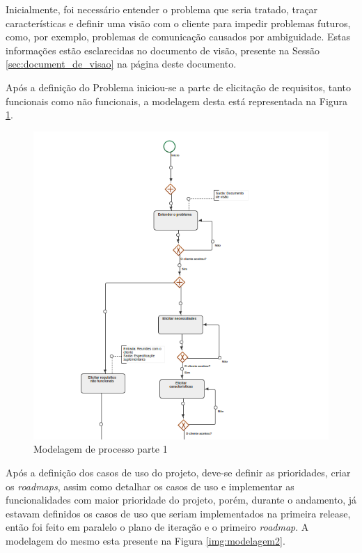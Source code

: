 
Inicialmente, foi necessário entender o problema que seria tratado, traçar características e definir uma visão com o cliente para impedir problemas futuros, como, por exemplo, problemas de comunicação causados por ambiguidade. Estas informações estão esclarecidas no documento de visão, presente na Sessão \ref{sec:document_de_visao} na página \pageref{sec:document_de_visao} deste documento.

Após a definição do Problema iniciou-se a parte de elicitação de requisitos, tanto funcionais como não funcionais, a modelagem desta está representada na Figura \ref{img:modelagem1}.

\begin{figure}[H]
	\centering
	\includegraphics[width=1\textwidth]{imgModelagem/modelagem1}
	\caption{Modelagem de processo parte 1}
	\label{img:modelagem1}
\end{figure}

Após a definição dos casos de uso do projeto, deve-se definir as prioridades, criar os \textit{roadmaps}, assim como detalhar os casos de uso e implementar as funcionalidades com maior prioridade do projeto, porém, durante o andamento, já estavam definidos os casos de uso que seriam implementados na primeira release, então foi feito em paralelo o plano de iteração e o primeiro \textit{roadmap}. A modelagem do mesmo esta presente na Figura \ref{img:modelagem2}.

